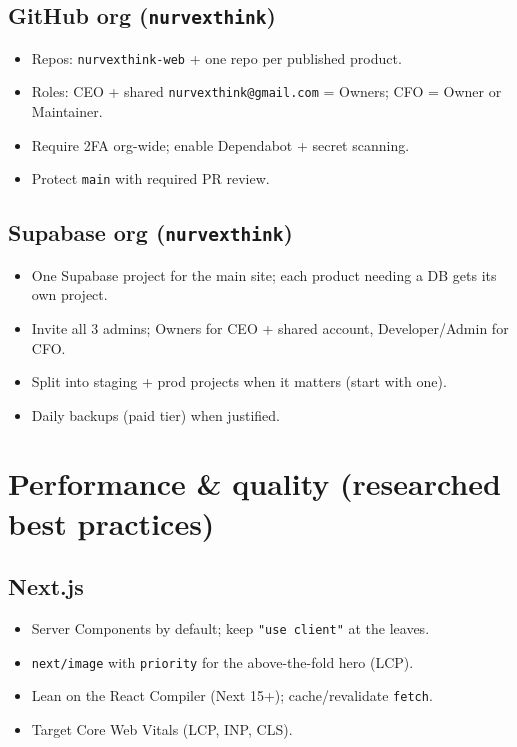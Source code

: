 \documentclass[11pt,a4paper]{article}
\begin{document}
\subsection{GitHub org (\texttt{nurvexthink})}
\begin{itemize}
  \item Repos: \texttt{nurvexthink-web} + one repo per published product.
  \item Roles: CEO + shared \texttt{nurvexthink@gmail.com} = Owners; CFO = Owner or Maintainer.
  \item Require 2FA org-wide; enable Dependabot + secret scanning.
  \item Protect \texttt{main} with required PR review.
\end{itemize}

\subsection{Supabase org (\texttt{nurvexthink})}
\begin{itemize}
  \item One Supabase project for the main site; each product needing a DB gets its own project.
  \item Invite all 3 admins; Owners for CEO + shared account, Developer/Admin for CFO.
  \item Split into staging + prod projects when it matters (start with one).
  \item Daily backups (paid tier) when justified.
\end{itemize}

\section{Performance \& quality (researched best practices)}
\subsection{Next.js}
\begin{itemize}
  \item Server Components by default; keep \texttt{"use client"} at the leaves.
  \item \texttt{next/image} with \texttt{priority} for the above-the-fold hero (LCP).
  \item Lean on the React Compiler (Next 15+); cache/revalidate \texttt{fetch}.
  \item Target Core Web Vitals (LCP, INP, CLS).
\end{itemize}
\end{document}
